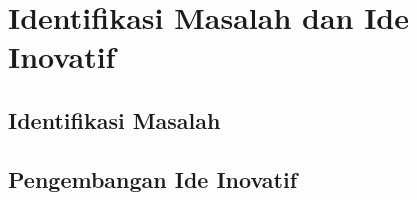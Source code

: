 \chapter{Identifikasi Masalah dan Ide Inovatif}

\section{Identifikasi Masalah}

\section{Pengembangan Ide Inovatif}
